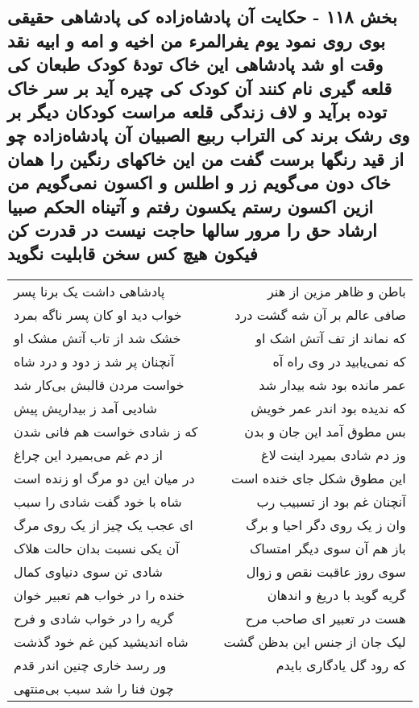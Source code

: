 \begin{center}
\section*{بخش ۱۱۸ - حکایت آن پادشاه‌زاده کی پادشاهی حقیقی  بوی روی نمود یوم یفرالمرء من اخیه و  امه و ابیه نقد وقت او شد پادشاهی  این خاک تودهٔ کودک طبعان کی قلعه گیری نام کنند آن کودک کی چیره آید بر سر  خاک توده برآید و لاف زندگی قلعه مراست کودکان دیگر بر وی  رشک برند کی التراب ربیع الصبیان آن پادشاه‌زاده چو از قید رنگها  برست گفت من این خاکهای رنگین را همان خاک دون می‌گویم زر  و اطلس و اکسون نمی‌گویم من ازین اکسون رستم یکسون رفتم و  آتیناه الحکم صبیا ارشاد حق را مرور سالها حاجت نیست در قدرت کن فیکون هیچ کس سخن قابلیت نگوید}
\label{sec:sh118}
\begin{longtable}{l p{0.5cm} r}
پادشاهی داشت یک برنا پسر
&&
باطن و ظاهر مزین از هنر
\\
خواب دید او کان پسر ناگه بمرد
&&
صافی عالم بر آن شه گشت درد
\\
خشک شد از تاب آتش مشک او
&&
که نماند از تف آتش اشک او
\\
آنچنان پر شد ز دود و درد شاه
&&
که نمی‌یابید در وی راه آه
\\
خواست مردن قالبش بی‌کار شد
&&
عمر مانده بود شه بیدار شد
\\
شادیی آمد ز بیداریش پیش
&&
که ندیده بود اندر عمر خویش
\\
که ز شادی خواست هم فانی شدن
&&
بس مطوق آمد این جان و بدن
\\
از دم غم می‌بمیرد این چراغ
&&
وز دم شادی بمیرد اینت لاغ
\\
در میان این دو مرگ او زنده است
&&
این مطوق شکل جای خنده است
\\
شاه با خود گفت شادی را سبب
&&
آنچنان غم بود از تسبیب رب
\\
ای عجب یک چیز از یک روی مرگ
&&
وان ز یک روی دگر احیا و برگ
\\
آن یکی نسبت بدان حالت هلاک
&&
باز هم آن سوی دیگر امتساک
\\
شادی تن سوی دنیاوی کمال
&&
سوی روز عاقبت نقص و زوال
\\
خنده را در خواب هم تعبیر خوان
&&
گریه گوید با دریغ و اندهان
\\
گریه را در خواب شادی و فرح
&&
هست در تعبیر ای صاحب مرح
\\
شاه اندیشید کین غم خود گذشت
&&
لیک جان از جنس این بدظن گشت
\\
ور رسد خاری چنین اندر قدم
&&
که رود گل یادگاری بایدم
\\
چون فنا را شد سبب بی‌منتهی

\end{longtable}
\end{center}
